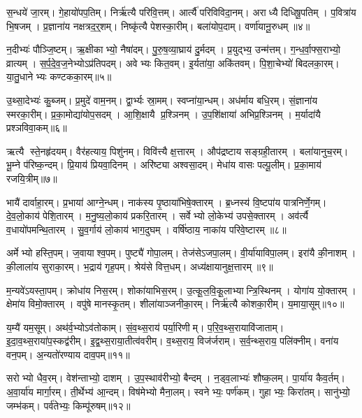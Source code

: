 स॒न्धये॑ जा॒रम्।
गे॒हायो॑पप॒तिम्।
निर्\mbox{}ऋ॑त्यै परिवि॒त्तम्।
आर्त्यै॑ परिविविदा॒नम्।
अराध्यै दिधिषू॒पतिम्।
प॒वित्रा॑य भि॒षजम्।
प्र॒ज्ञाना॑य नक्षत्रद॒र्॒शम्।
निष्कृ॑त्यै पेशस्का॒रीम्।
बला॑योप॒दाम्।
वर्णा॑यानू॒रुधम्॥४॥

न॒दीभ्यः॑ पौञ्जि॒ष्टम्।
ऋ॒क्षीकाभ्यो॒ नैषा॑दम्।
पु॒रु॒ष॒व्या॒घ्राय॑ दु॒र्मदम्।
प्र॒युद्भ्य॒ उन्म॑त्तम्।
ग॒न्ध॒र्वा॒फ्स॒राभ्यो॒ व्रात्यम्।
स॒र्प॒दे॒व॒ज॒नेभ्यो\-ऽप्र॑तिपदम्।
अवेभ्यः कित॒वम्।
इ॒र्यता॑या॒ अकि॑तवम्।
पि॒शा॒चेभ्यो॑ बिदलका॒रम्।
या॒तु॒धानेभ्यः कण्टकका॒रम्॥५॥

उ॒थ्सा॒देभ्यः॑ कु॒ब्जम्।
प्र॒मुदे॑ वाम॒नम्।
द्वा॒र्भ्यः स्रा॒मम्।
स्वप्ना॑या॒न्धम्।
अध॑र्माय बधि॒रम्।
सं॒ज्ञाना॑य स्मरका॒रीम्।
प्र॒का॒मोद्या॑योप॒सदम्।
आ॒शि॒क्षायै प्र॒श्ञिनम्।
उ॒प॒शि॑क्षाया॑ अभिप्र॒श्ञिनम्।
म॒र्यादा॑यै प्रश्ञविवा॒कम्॥६॥

ऋत्यै स्ते॒नहृ॑दयम्।
वैर॑हत्याय॒ पिशु॑नम्।
विवि॑त्त्यै क्ष॒त्तारम्।
औप॑द्रष्टाय सङ्ग्रही॒तारम्।
बला॑यानुच॒रम्।
भू॒म्ने प॑रिष्क॒न्दम्।
प्रि॒याय॑ प्रियवा॒दिनम्।
अरि॑ष्ट्या अश्वसा॒दम्।
मेधा॑य वासः पल्पू॒लीम्।
प्र॒का॒माय॑ रजयि॒त्रीम्॥७॥

भायै॑ दार्वाहा॒रम्।
प्र॒भाया॑ आग्ने॒न्धम्।
नाक॑स्य पृ॒ष्ठाया॑भिषे॒क्तारम्।
ब्र॒ध्नस्य॑ वि॒ष्टपा॑य पात्रनिर्णे॒गम्।
दे॒व॒लो॒काय॑ पेशि॒तारम्।
म॒नु॒ष्य॒लो॒काय॑ प्रकरि॒तारम्।
सर्वेभ्यो लो॒केभ्य॑ उपसे॒क्तारम्।
अव॑र्त्यै व॒धायो॑पमन्थि॒तारम्।
सु॒व॒र्गाय॑ लो॒काय॑ भाग॒दुघम्।
वर्\mbox{}षि॑ष्ठाय॒ नाका॑य परिवे॒ष्टारम्॥८॥

अर्मेभ्यो हस्ति॒पम्।
ज॒वायाश्व॒पम्।
पुष्ट्यै॑ गोपा॒लम्।
तेज॑से\-ऽजपा॒लम्।
वी॒र्या॑याविपा॒लम्।
इरा॑यै की॒नाशम्।
की॒लाला॑य सुराका॒रम्।
भ॒द्राय॑ गृह॒पम्।
श्रेय॑से वित्त॒धम्।
अध्य॑क्षायानुक्ष॒त्तारम्॥९॥

म॒न्यवे॑\-ऽयस्ता॒पम्।
क्रोधा॑य निस॒रम्।
शोका॑याभिस॒रम्।
उ॒त्कू॒ल॒वि॒कू॒लाभ्यान्त्रि॒स्थिनम्।
योगा॑य यो॒क्तारम्।
क्षेमा॑य विमो॒क्तारम्।
वपु॑षे मानस्कृ॒तम्।
शीला॑याञ्जनीका॒रम्।
निर्\mbox{}ऋ॑त्यै कोशका॒रीम्।
य॒माया॒सूम्॥१०॥

य॒म्यै॑ यम॒सूम्।
अथ॑र्व॒भ्यो\-ऽव॑तोकाम्।
सं॒व॒थ्स॒राय॑ पर्या॒रिणीम्।
प॒रि॒व॒थ्स॒रायावि॑जाताम्।
इ॒दा॒व॒थ्स॒राया॑प॒स्कद्व॑रीम्।
इ॒द्व॒थ्स॒राया॒तीत्व॑वरीम्।
व॒थ्स॒राय॒ विज॑र्जराम्।
स॒र्व॒न्थ्स॒राय॒ पलि॑क्नीम्।
वना॑य वन॒पम्।
अ॒न्यतो॑रण्याय दाव॒पम्॥११॥

सरोभ्यो धैव॒रम्।
वेश॑न्ताभ्यो॒ दाशम्।
उ॒प॒स्थाव॑रीभ्यो॒ बैन्दम्।
न॒ड्व॒लाभ्यः॑ शौष्क॒लम्।
पा॒र्या॑य कैव॒र्तम्।
अ॒वा॒र्या॑य मार्गा॒रम्।
ती॒र्थेभ्य॑ आ॒न्दम्।
विष॑मेभ्यो मैना॒लम्।
स्वनेभ्यः॒ पर्ण॑कम्।
गुहाभ्यः॒ किरा॑तम्।
सानु॑भ्यो॒ जम्भ॑कम्।
पर्व॑तेभ्यः॒ किम्पू॑रुषम्॥१२॥

